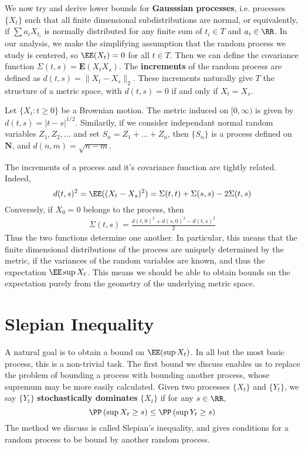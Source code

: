 We now try and derive lower bounds for \textbf{Gausssian processes}, i.e. processes $\{ X_t \}$ such that all finite dimensional subdistributions are normal, or equivalently, if $\sum a_i X_{t_i}$ is normally distributed for any finite sum of $t_i \in T$ and $a_i \in \RR$. In our analysis, we make the simplifying assumption that the random process we study is centered, so $\EE(X_t) = 0$ for all $t \in T$. Then we can define the covariance function $\Sigma(t,s) = \mathbf{E}(X_t X_s)$. The \textbf{increments} of the random process are defined as $d(t,s) = \| X_t - X_s \|_2$.  These increments naturally give $T$ the structure of a metric space, with $d(t,s) = 0$ if and only if $X_t = X_s$.

\begin{example}
    Let $\{ X_t : t \geq 0 \}$ be a Brownian motion. The metric induced on $[0,\infty)$ is given by $d(t,s) = |t-s|^{1/2}$. Similarily, if we consider independant normal random variables $Z_1, Z_2, \dots$ and set $S_n = Z_1 + \dots + Z_n$, then $\{ S_n \}$ is a process defined on $\mathbf{N}$, and $d(n,m) = \sqrt{n-m}$.
\end{example}

The increments of a process and it's covariance function are tightly related. Indeed,
%
\[ d(t,s)^2 = \EE((X_t - X_s)^2) = \Sigma(t,t) + \Sigma(s,s) - 2 \Sigma(t,s) \]
%
Conversely, if $X_0 = 0$ belongs to the process, then
%
\begin{align*}
    \Sigma(t,s) = \frac{d(t,0)^2 + d(s,0)^2 - d(t,s)^2}{2}
\end{align*}
%
Thus the two functions determine one another. In particular, this means that the finite dimensional distributions of the process are uniquely determined by the metric, if the variances of the random variables are known, and thus the expectation $\EE \sup X_t$. This means we should be able to obtain bounds on the expectation purely from the geometry of the underlying metric space.

\section{Slepian Inequality}

A natural goal is to obtain a bound on $\EE(\sup X_t)$. In all but the most basic process, this is a non-trivial task. The first bound we discuss enables us to replace the problem of bounding a process with bounding another process, whose supremum may be more easily calculated. Given two processes $\{ X_t \}$ and $\{ Y_t \}$, we say $\{ Y_t \}$ \textbf{stochastically dominates} $\{ X_t \}$ if for any $s \in \RR$,
%
\[ \PP \left( \sup X_t \geq s \right) \leq \PP \left( \sup Y_t \geq s \right) \]
%
The method we discuss is called Slepian's inequality, and gives conditions for a random process to be bound by another random process.


